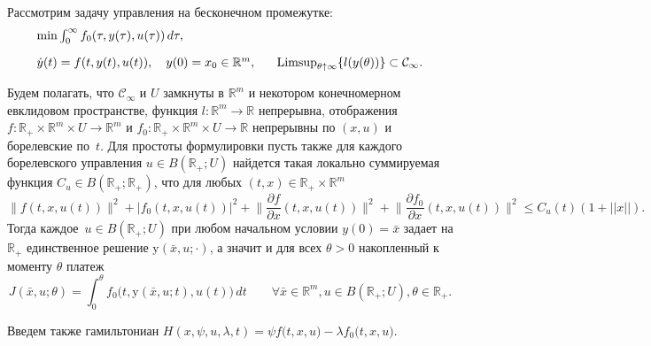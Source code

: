 	Рассмотрим задачу управления на бесконечном промежутке:
$$
\begin{array}{l}
	\min \int_{0}^\infty f_0(\tau,y(\tau),u(\tau))\, d\tau,\\[1em]
\dot{y}(t)=f(t,y(t),u(t)),  \quad y(0)=x_0\in\mathbb{R}^m
,\quad
\ \mathop{\hbox{ \rm{Limsup}}}_{\theta\uparrow\infty} \{l(y(\theta))\}\subset \mathcal{C}_\infty.
\end{array}
$$

Будем полагать, что $\mathcal{C}_\infty$ и $U$  замкнуты в $\mathbb{R}^m$ и некотором конечномерном евклидовом пространстве, функция $l:\mathbb{R}^m\to\mathbb{R}$ непрерывна,
отображения  $f:\mathbb{R}_+\times\mathbb{R}^m\times U\to\mathbb{R}^m$ и
$f_0:\mathbb{R}_+\times\mathbb{R}^m\times U\to\mathbb{R}$
непрерывны по $(x,u)$ и борелевские по~$t$.
Для простоты формулировки пусть также для каждого борелевского управления $u\in B(\mathbb{R}_+;U)$ найдется такая локально суммируемая функция $C_u\in B(\mathbb{R}_+;\mathbb{R}_+)$, что  для любых $(t,x)\in\mathbb{R}_+\times\mathbb{R}^m$
\[ \|f(t,x,u(t))\|^2+|f_0(t,x,u(t))|^2+\Big\|\frac{\partial f}{\partial x}(t,x,u(t))\Big\|^2+\Big\|\frac{\partial f_0}{\partial x}(t,x,u(t))\Big\|^2\leq C_u(t)(1+||x||).\]
Тогда каждое~$u\in B(\mathbb{R}_+;U)$  при любом начальном условии $y(0)=\bar{x}$ задает на $\mathbb{R}_+$ единственное  решение ${ \mathrm{y}}(\bar{x},u;\cdot)$, а значит и для всех $\theta>0$ накопленный к моменту $\theta$ платеж
\[      	J(\bar{x},u;\theta)=\int_{0}^{\theta} f_0\big(t,{ \mathrm{y}}(\bar{x},u;t),u(t)\big)\,dt\qquad\forall
\bar{x}\in\mathbb{R}^m,u\in B(\mathbb{R}_+;U),\theta\in\mathbb{R}_+. \]

Введем также
гамильтониан
$
H(x,\psi,u,\lambda,t)=\psi f\big(t,x,u\big)-\lambda
f_0\big(t,x,u\big).
$

